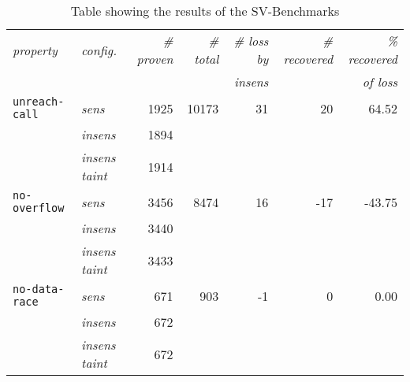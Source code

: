       \begin{table}
        \centering
        \begin{tabular}{l|l||r|r||r|r|r}
          \textit{property} & \textit{config.} & \textit{\# proven} & \textit{\# total} & \textit{\# loss by} & \textit{\# recovered} & \textit{\% recovered}\\
            &  &  &  & \textit{insens} & & \textit{of loss}\\
          \hline
          \texttt{unreach-call} & \textit{sens} & 1925 & 10173 & 31 & 20 & 64.52\\
          & \textit{insens} & 1894 & & & & \\
          & \textit{insens taint} & 1914 & & & & \\
          \hline
          \texttt{no-overflow} & \textit{sens} & 3456 & 8474 & 16 & -17 & -43.75\\
          & \textit{insens} & 3440 & & & & \\
          & \textit{insens taint} & 3433 & & & & \\
          \hline
          \texttt{no-data-race} & \textit{sens} & 671 & 903 & -1 & 0 & 0.00\\
          & \textit{insens} & 672 & & & & \\
          & \textit{insens taint} & 672 & & & & \\
          \hline
        \end{tabular}
        \caption{Table showing the results of the SV-Benchmarks}
        \label{tbl:resultSVbench}
      \end{table}

     

